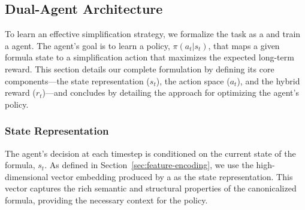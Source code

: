 \subsection{Dual-Agent Architecture}
\label{sec:policy-formulation-and-optimization}

To learn an effective simplification strategy, we formalize the task as a \MDP{} and train a \RL{} agent. The agent's goal is to learn a policy, $\pi(a_t|s_t)$, that maps a given formula state to a simplification action that maximizes the expected long-term reward.
This section details our complete \MDP{} formulation by defining its core components---the state representation ($s_t$), the action space ($a_t$), and the hybrid reward ($r_t$)---and concludes by detailing the approach for optimizing the agent's policy.

\subsubsection{State Representation}
The agent's decision at each timestep is conditioned on the current state of the formula, $s_t$. As defined in Section~\ref{sec:feature-encoding}, we use the high-dimensional vector embedding produced by a \PLM{} as the state representation. This vector captures the rich semantic and structural properties of the canonicalized formula, providing the necessary context for the policy.

